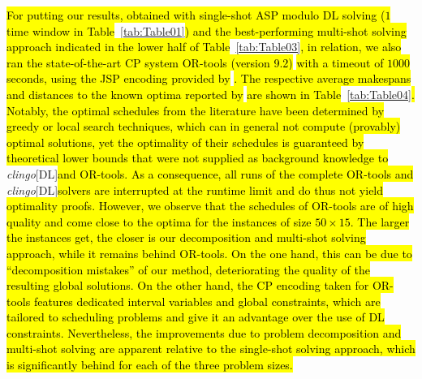 \documentclass{tlp} %
\newcommand{\clingodl}{\emph{clingo}[DL]\xspace}
\begin{document}
\hl{For putting our results, obtained with single-shot ASP modulo DL solving ($1$ time window in Table}~\ref{tab:Table01}\hl{) and the best-performing multi-shot solving approach
indicated in the lower half of Table}~\ref{tab:Table03}\hl{, in relation,
we also ran the state-of-the-art CP system OR-tools (version 9.2)} \citep{ortools}\hl{
with a timeout of $1000$ seconds,
using the JSP encoding provided by} \cite{tagesc21a}\hl{.
The respective average makespans and distances to the known optima reported by}
\cite{taillard1993benchmarks}\hl{ are shown in Table}~\ref{tab:Table04}\hl{.
Notably, the optimal schedules from the literature have been determined by greedy or
local search techniques, which can in general not compute (provably) optimal solutions,
yet the optimality of their schedules is guaranteed by theoretical lower bounds that were
not supplied as background knowledge to} \clingodl \hl{and OR-tools.
As a consequence, all runs of the complete OR-tools and} \clingodl \hl{solvers are
interrupted at the runtime limit and do thus not yield optimality proofs.
However, we observe that the schedules of OR-tools are of high quality and
come close to the optima for the instances of size $50\times15$.
The larger the instances get, the closer is our decomposition and multi-shot solving approach,
while it remains behind OR-tools.
On the one hand, this can be due to ``decomposition mistakes'' of our method,
deteriorating the quality of the resulting global solutions.
On the other hand, the CP encoding taken for OR-tools features dedicated interval variables
and global constraints, which are tailored to scheduling problems and give it an advantage
over the use of DL constraints.
Nevertheless, the improvements due to problem decomposition and multi-shot solving are apparent
relative to the single-shot solving approach, which is significantly behind for each of the three problem sizes.}
\end{document}
